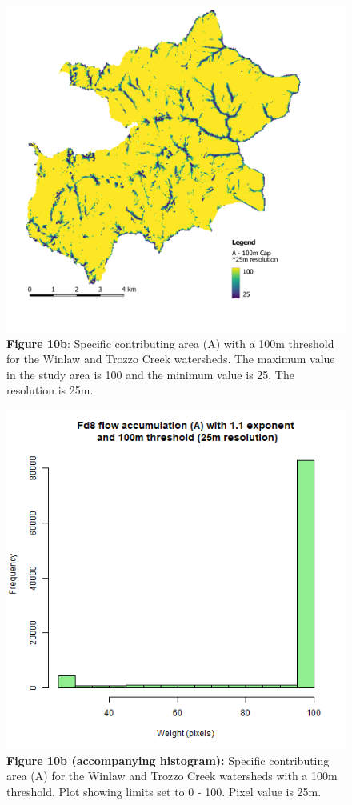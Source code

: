 \documentclass[
]{article}
\begin{document}
\begin{figure}
\centering
\includegraphics{img/a_25m_100m_cap.png}
\caption{\textbf{Figure 10b}: Specific contributing area (A) with a 100m threshold for the Winlaw and Trozzo Creek watersheds. The maximum value in the study area is 100 and the minimum value is 25. The resolution is 25m.}
\end{figure}

\begin{figure}
\centering
\includegraphics{img/A_25m_hist_N.png}
\caption{\textbf{Figure 10b (accompanying histogram):} Specific contributing area (A) for the Winlaw and Trozzo Creek watersheds with a 100m threshold. Plot showing limits set to 0 - 100. Pixel value is 25m.}
\end{figure}
\end{document}
